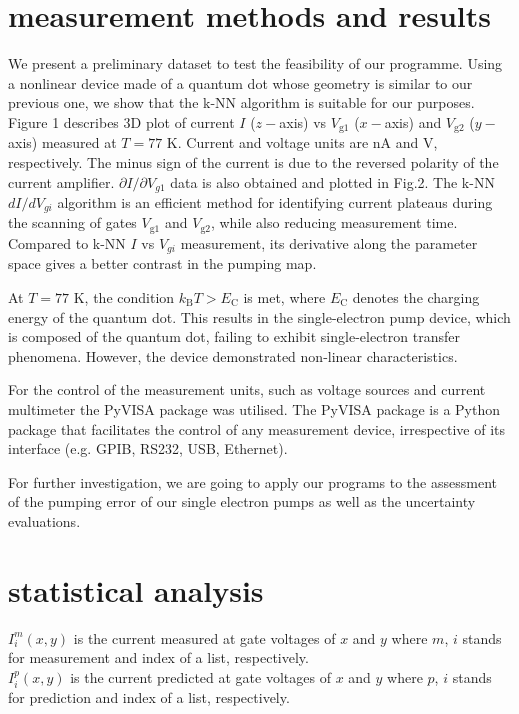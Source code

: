 \documentclass[jkps,preprint,fleqn,showpacs,showkeys]{revtex4}
\begin{document}
\section{measurement methods and results}
We present a preliminary dataset to test the feasibility of our programme.
Using a nonlinear device made of a quantum dot whose geometry is similar to our previous one\cite{bae}, we show that the k-NN algorithm is suitable for our purposes.
Figure 1 describes 3D plot of current $I$ ($z-$axis) vs $V_\text{g1}$ ($x-$axis) and $V_\text{g2}$ ($y-$axis) measured at $T=77$ K. Current and voltage units are nA and V, respectively. 
The minus sign of the current is due to the reversed polarity of the current amplifier. 
$\partial I/\partial V_{g1}$ data is also obtained and plotted in Fig.2. 
The k-NN $dI/dV_{gi}$ algorithm is an efficient method for identifying current plateaus during the scanning of gates  $V_\text{g1}$ and $V_\text{g2}$, while also reducing measurement time. Compared to k-NN $I$ vs $V_{gi}$ measurement, its derivative along the parameter space gives a better contrast in the pumping map.


At $T=77$ K, the condition $k_\text{B}T > E_\text{C} $ is met, where $E_\text{C} $ denotes the charging energy of the quantum dot. This results in the single-electron pump device, which is composed of the quantum dot, failing to exhibit single-electron transfer phenomena. However, the device demonstrated non-linear characteristics.

For the control of the measurement units, such as voltage sources and current multimeter the PyVISA package was utilised. The PyVISA package is a Python package that facilitates the control of any measurement device, irrespective of its interface (e.g. GPIB, RS232, USB, Ethernet)\cite{pyvisa}.


For further investigation, we are going to apply our programs to the assessment of the pumping error of our single electron pumps as well as the uncertainty evaluations.


\section{statistical analysis}

$I^m_i(x,y)$ is the current measured at gate voltages of $x$ and $y$ where $m$, $i$ stands for measurement and {\color{red}index of a list}, respectively.\\
$I^p_i(x,y)$ is the current predicted at gate voltages of $x$ and $y$ where $p$, $i$ stands for prediction and {\color{red}index of a list}, respectively.\\
\end{document}
